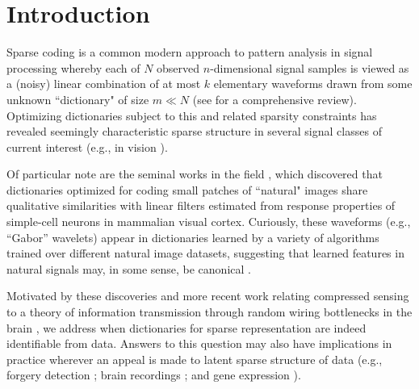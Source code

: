 \section{Introduction}\label{Intro}



Sparse coding is a common modern approach to pattern analysis in signal processing whereby each of $N$ observed $n$-dimensional signal samples is viewed as a (noisy) linear combination of at most $k$ elementary waveforms drawn from some unknown ``dictionary" of size $m \ll N$ (see \cite{Zhang15} for a comprehensive review). 
Optimizing dictionaries subject to this and related sparsity constraints has revealed seemingly characteristic sparse structure in several signal classes of current interest (e.g., in vision \cite{wang2015sparse}). 

Of particular note are the seminal works in the field \cite{Olshausen96, hurri1996image, bell1997independent, van1998independent}, which discovered that dictionaries optimized for coding small patches of ``natural" images share qualitative similarities with linear filters estimated from response properties of simple-cell neurons in mammalian visual cortex. Curiously, these waveforms (e.g., ``Gabor'' wavelets) appear in dictionaries learned by a variety of algorithms trained over different natural image datasets, suggesting that learned features in natural signals may, in some sense, be canonical \cite{donoho2001can}.

Motivated by these discoveries and more recent work relating compressed sensing \cite{eldar2012compressed} to a theory of information transmission through random wiring bottlenecks in the brain \cite{Isely10}, we address when dictionaries for sparse representation are indeed identifiable from data. Answers to this question may also have implications in practice wherever an appeal is made to latent sparse structure of data (e.g., forgery detection \cite{hughes2010, olshausen2010applied}; brain recordings \cite{jung2001imaging, agarwal2014spatially, lee2016sparse}; and gene expression \cite{wu2016stability}). 

